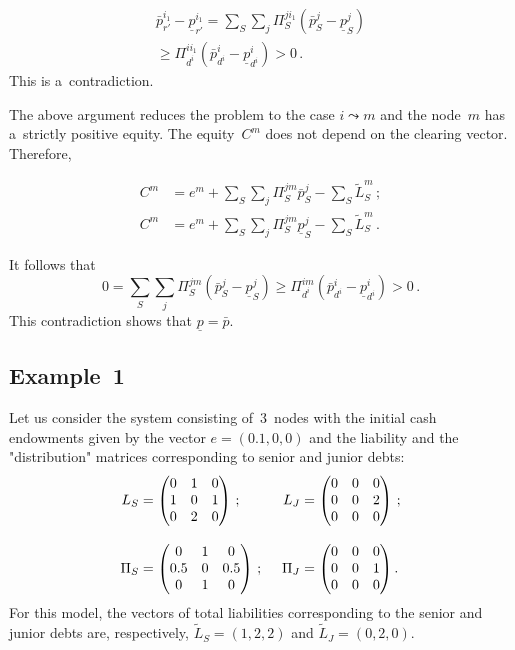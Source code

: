 \begin{multicols}{2}
\noindent
\begin{multline*}
\bar p^{i_1}_{r'}-\underline p^{i_1}_{r'}=\sum\limits_S \sum\limits_j\Pi_S^{ji_1}
\left(\bar  p_{S}^j-\underline  p_{S}^j\right)\\
{}\ge \Pi_{d^i}^{ii_1}
\left(\bar p_{d^i}^i-\underline   p_{d^i}^i\right)>0\,.
\end{multline*}
This is a~contradiction.

\pagebreak

The above argument reduces the problem to the case $i\leadsto m$ and the node~$m$ 
has a~strictly positive equity.  The equity~$C^m$ does not depend on the 
clearing vector.  Therefore,

\noindent
\begin{align*}
C^m&=e^{m}+ \sum\limits_S \sum\limits_j\Pi_S^{jm}\bar p_{S}^j-
\sum\limits_{S}\tilde L_{S}^{m}\,;\\
C^m&=e^{m}+ \sum\limits_S \sum\limits_j\Pi_S^{jm}\underline p_{S}^j-
\sum\limits_{S}\tilde L_{S}^{m}\,.
\end{align*}


\noindent
It follows that
$$
0=\sum\limits_S \sum\limits_j\Pi_S^{jm}\left(\bar p_{S}^j-\underline p_{S}^j\right)\ge 
\Pi_{d^i}^{im}\left(\bar p_{d^i}^i-\underline  p_{d^i}^i\right)>0\,.
$$
This contradiction shows that $\underline p=\bar p$.

\subsection{Example~1}

\noindent
Let us consider the system consisting of~3~nodes with the initial cash 
endowments
given by the vector $e=(0.1,0,0)$ and the liability and the "distribution"  
matrices corresponding to senior and junior debts:
\begin{alignat*}{2}
L_S&=
\begin{pmatrix}
0 & 1 & 0\\
1 & 0 & 1\\
0 & 2 & 0
\end{pmatrix}\,; &\enskip
L_J&=\begin{pmatrix}
0 & 0 & 0\\
0& 0 & 2\\
0 & 0 & 0
\end{pmatrix}\,;
\\[9pt]
\Pi_S&=
\begin{pmatrix}
0 & 1 & 0\\
0.5 & 0 & 0.5\\
0 & 1 & 0
\end{pmatrix}\,; &\enskip
\Pi_J&=\begin{pmatrix}
0 & 0 & 0\\
0& 0 & 1\\
0 & 0 & 0
\end{pmatrix}.
\end{alignat*}
For this model, the vectors of total liabilities corresponding to the senior and 
junior debts are, respectively, $\tilde L_S=(1,2,2)$ and   $\tilde L_J=(0,2,0)$.


\end{multicols}
